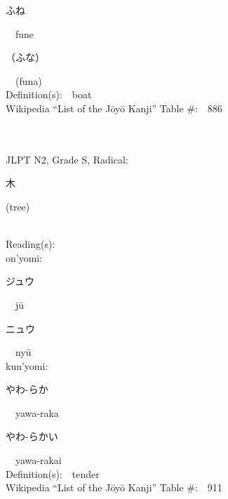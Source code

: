 \begin{multicols}{2}
{\hspace*{2em}}{\begin{CJK}{UTF8}{min} ふね \end{CJK}}\ \ fune\ \ \\
{\hspace*{2em}}{\begin{CJK}{UTF8}{min} （ふな） \end{CJK}}\ \ (funa)\ \ \\
Definition(s):\ \ boat \\
Wikipedia ``List of the J\=oy\=o Kanji'' Table \#:\ \ 886 \\
\ \ \\
{\fontsize{34pt}{40pt}  }\ \ \\  %
{JLPT N2, Grade S, Radical:\ \ {\begin{CJK}{UTF8}{min} 木 \end{CJK}} (tree) } \\
Reading(s):\ \ \\
{\hspace*{1em}}on'yomi:\ \ \\
{\hspace*{2em}}{\begin{CJK}{UTF8}{min} ジュウ \end{CJK}}\ \ j\=u\ \ \\
{\hspace*{2em}}{\begin{CJK}{UTF8}{min} ニュウ \end{CJK}}\ \ ny\=u\ \ \\
{\hspace*{1em}}kun'yomi:\ \ \\
{\hspace*{2em}}{\begin{CJK}{UTF8}{min} やわ-らか \end{CJK}}\ \ yawa-raka\ \ \\
{\hspace*{2em}}{\begin{CJK}{UTF8}{min} やわ-らかい \end{CJK}}\ \ yawa-rakai\ \ \\
Definition(s):\ \ tender \\
Wikipedia ``List of the J\=oy\=o Kanji'' Table \#:\ \ 911 \\
\ \ \\
{\fontsize{34pt}{40pt}  }\ \ \\  %

\end{multicols}
